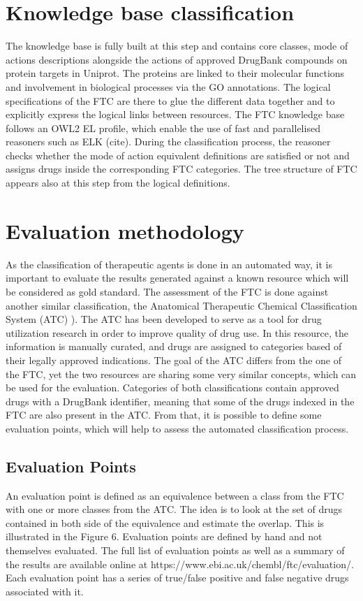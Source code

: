 \documentclass{bioinfo}
\begin{document}
\section{Knowledge base classification}
The knowledge base is fully built at this step and contains core classes, mode 
of actions descriptions alongside the actions of approved DrugBank compounds on 
protein targets in Uniprot. The proteins are linked to their molecular functions and involvement in 
biological processes via the GO annotations. The logical specifications of the FTC are there to glue 
the different data together and to explicitly express the logical links between resources. The FTC 
knowledge base follows an OWL2 EL profile, which enable the use of fast and parallelised reasoners such 
as ELK (cite). During the classification process, the reasoner checks whether the mode of action equivalent 
definitions are satisfied or not and assigns drugs inside the corresponding FTC categories. The tree structure 
of FTC appears also at this step from the logical definitions.

\section{Evaluation methodology}
As the classification of therapeutic agents is done in an automated way, it 
is important to evaluate the results generated against a known resource which will be 
considered as gold standard. The assessment of the FTC is done against another similar 
classification, the Anatomical Therapeutic Chemical Classification System (ATC) \citep{world2000anatomical}). 
The ATC has been developed to serve as a tool for drug utilization research in order to 
improve quality of drug use. In this resource, the information is manually curated, and drugs 
are assigned to categories based of their legally approved indications. The goal of the ATC differs 
from the one of the FTC, yet the two resources are sharing some very similar concepts, which can be 
used for the evaluation. Categories of both classifications contain approved drugs with a DrugBank 
identifier, meaning that some of the drugs indexed in the FTC are also present in the ATC. From that, 
it is possible to define some evaluation points, which will help to assess the automated classification process.

\subsection{Evaluation Points}
An evaluation point is defined as an equivalence between a class from the FTC with one or 
more classes from the ATC. The idea is to look at the set of drugs contained in both side of the 
equivalence and estimate the overlap. This is illustrated in the Figure 6. Evaluation points are defined 
by hand and not themselves evaluated. The full list of evaluation points as well as a summary of the results 
are available online at https://www.ebi.ac.uk/chembl/ftc/evaluation/. Each evaluation point has a series of 
true/false positive and false negative drugs associated with it.
 
\end{document}
